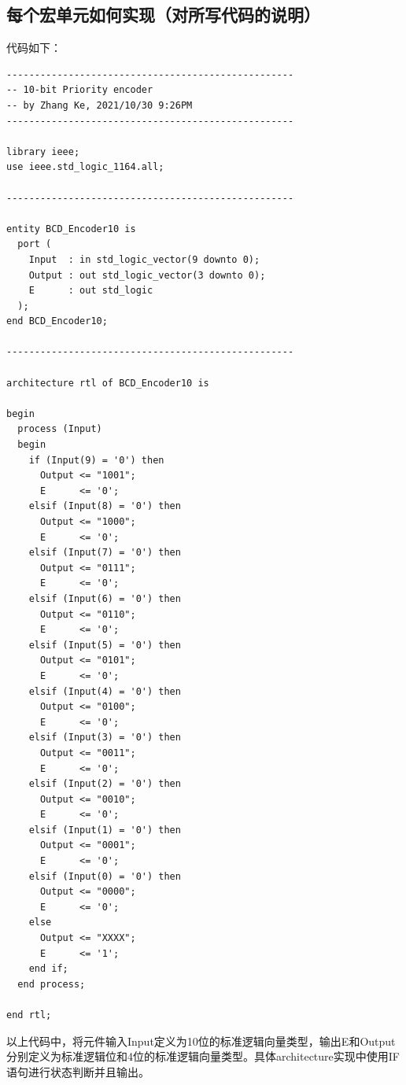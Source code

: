 \documentclass[12pt]{article}
\begin{document}
\subsection{每个宏单元如何实现（对所写代码的说明）}
代码如下：
 \begin{verbatim}
---------------------------------------------------
-- 10-bit Priority encoder
-- by Zhang Ke, 2021/10/30 9:26PM
---------------------------------------------------

library ieee;
use ieee.std_logic_1164.all;

---------------------------------------------------

entity BCD_Encoder10 is
  port (
    Input  : in std_logic_vector(9 downto 0);
    Output : out std_logic_vector(3 downto 0);
    E      : out std_logic
  );
end BCD_Encoder10;

---------------------------------------------------

architecture rtl of BCD_Encoder10 is

begin
  process (Input)
  begin
    if (Input(9) = '0') then
      Output <= "1001";
      E      <= '0';
    elsif (Input(8) = '0') then
      Output <= "1000";
      E      <= '0';
    elsif (Input(7) = '0') then
      Output <= "0111";
      E      <= '0';
    elsif (Input(6) = '0') then
      Output <= "0110";
      E      <= '0';
    elsif (Input(5) = '0') then
      Output <= "0101";
      E      <= '0';
    elsif (Input(4) = '0') then
      Output <= "0100";
      E      <= '0';
    elsif (Input(3) = '0') then
      Output <= "0011";
      E      <= '0';
    elsif (Input(2) = '0') then
      Output <= "0010";
      E      <= '0';
    elsif (Input(1) = '0') then
      Output <= "0001";
      E      <= '0';
    elsif (Input(0) = '0') then
      Output <= "0000";
      E      <= '0';
    else
      Output <= "XXXX";
      E      <= '1';
    end if;
  end process;

end rtl;
  \end{verbatim}
以上代码中，将元件输入Input定义为10位的标准逻辑向量类型，输出E和Output分别定义为标准逻辑位和4位的标准逻辑向量类型。具体architecture实现中使用IF语句进行状态判断并且输出。\\
\end{document}
